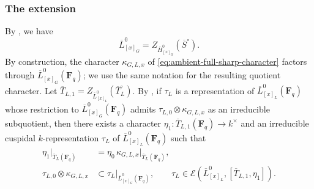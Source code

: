 \documentclass[reqno]{amsart}
\numberwithin{equation}{subsection}
\newcommand{\F}{\mathbf{F}}
\newcommand{\ol}[1]{\overline{#1}}
\newcommand{\co}{\colon}
\newcommand\cB{\mathcal{B}}
\newcommand\cE{\mathcal{E}}
\newtheorem{cor}[thm]{Corollary}
\theoremstyle{remark}
\numberwithin{equation}{subsection}
\numberwithin{figure}{subsection}
\begin{document}



\subsubsection{The extension} 

By \cite[Lemma~2.1.3]{Cot26b}, we have
\begin{equation}\label{eq:ambient-smaller-quotient}
\ol L^0_{[x]_G}=Z_{\ol H^0_{[x]_G}}(\ol S^\circ).
\end{equation}
By construction, the character $\kappa_{G,L,x}$ of \eqref{eq:ambient-full-sharp-character} factors through $\ol L^0_{[x]_G}(\F_q)$; we use the same notation for the resulting quotient character. Let $\ol T_{L,1} = Z_{\ol L^0_{[x]_L}}(\ol T_L^\circ)$. By \cite[Lemma~2.10.3]{Cot26b}, if $\tau_L$ is a representation of $\ol L^0_{[x]_L}(\F_q)$ whose restriction to $\ol L^0_{[x]_G}(\F_q)$ admits $\tau_{L,0} \otimes \kappa_{G,L,x}$ as an irreducible subquotient, then there exists a character $\eta_1\co\ol T_{L,1}(\F_q)\to k^\times$ and an irreducible cuspidal $k$-representation $\tau_L$ of $\ol L^0_{[x]_L}(\F_q)$ such that
\begin{align}
\eta_1|_{\ol T_L(\F_q)}
&=\eta_0\,\kappa_{G,L,x}|_{\ol T_L(\F_q)},
\label{eq:signed-descendant-pair}\\
\tau_{L,0}\otimes\kappa_{G,L,x}
&\subset\tau_L|_{\ol L^0_{[x]_G}(\F_q)},
\qquad
\tau_L\in\cE(\ol L^0_{[x]_L},[\ol T_{L,1},\eta_1]).
\label{eq:signed-descendant-restriction}
\end{align}
\end{document}
